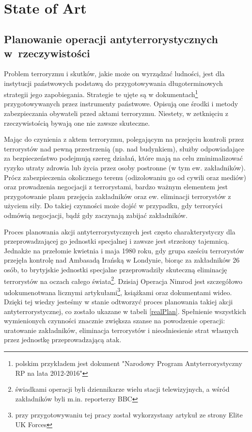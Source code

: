 \chapter{State of Art}
\section{Planowanie operacji antyterrorystycznych w~rzeczywistości}
Problem terroryzmu i skutków, jakie może on wyrządzać ludności, jest dla instytucji państwowych podstawą do przygotowywania długoterminowych strategii jego zapobiegania. Strategie te ujęte są w dokumentach\footnote{polskim przykładem jest dokument "Narodowy Program Antyterrorystyczny RP na lata 2012-2016"} przygotowywanych przez instrumenty państwowe. Opisują one środki i metody zabezpieczania obywateli przed aktami terroryzmu. Niestety, w zetknięciu z rzeczywistością bywają one nie zawsze skuteczne.

Mając do czynienia z aktem terroryzmu, polegającym na przejęciu kontroli przez terrorystów nad pewną przestrzenią (np. nad budynkiem), służby odpowiadające za bezpieczeństwo podejmują szereg działań, które mają na celu zminimalizować ryzyko utraty zdrowia lub życia przez osoby postronne (w tym ew. zakładników). Prócz zabezpieczenia okolicznego terenu (odizolowaniu go od cywili oraz mediów) oraz prowadzenia negocjacji z terrorystami, bardzo ważnym elementem jest przygotowanie planu przejęcia zakładników oraz ew. eliminacji terrorystów z użyciem siły. Do takiej czynności może dojść w przypadku, gdy terroryści odmówią negocjacji, bądź gdy zaczynają zabijać zakładników.

Proces planowania akcji antyterrorystycznych jest często charakterystyczy dla przeprowadzającej go jednostki specjalnej i zawsze jest strzeżony tajemnicą. Jednakże na przełomie kwietnia i maja 1980 roku, gdy grupa sześciu terrorystów przejęła kontrolę nad Ambasadą Irańską w Londynie, biorąc za zakładników 26 osób, to brytyjskie jednostki specjalne przeprowadziły skuteczną eliminację terrorystów na oczach całego świata\footnote{świadkami operacji byli dziennikarze wielu stacji telewizyjnych, a wśród zakładników byli m.in. reporterzy BBC}. Dzisiaj Operacja Nimrod jest szczegółowo udokumenotwana licznymi artykułami\footnote{przy przygotowywaniu tej pracy został wykorzystany artykuł ze strony Elite UK Forces\cite{eliteUK}}, książkami oraz dokumentami wideo. Dzięki tej wiedzy jesteśmy w stanie odtworzyć proces planowania takiej akcji antyterrorystycznej, co zostało ukazane w tabeli \ref{realPlan}. Spełnienie wszystkich wymienionych czynności znacznie zwiększa szanse na powodzenie operacji: uratowanie zakładników, eliminacja terrorystów i nieodniesienie strat własnych przez jednostkę przeprowadzającą atak.

